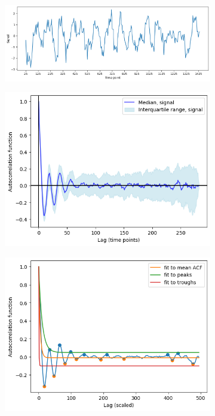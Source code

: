 \begin{figure}
  \centering
  \begin{subfigure}[t]{0.8\textwidth}
  \centering
    \includegraphics[width=\linewidth]{acf_sinusoid_biol_ts.png}
    \caption{
    }
    \label{fig:acf-sinusoid-biol-ts}
  \end{subfigure}

  \begin{subfigure}[t]{0.5\textwidth}
  \centering
    \includegraphics[width=\linewidth]{acf_sinusoid_biol_acf.png}
    \caption{
    }
    \label{fig:acf-sinusoid-biol-acf}
  \end{subfigure}%
  \begin{subfigure}[t]{0.5\textwidth}
  \centering
    \includegraphics[width=\linewidth]{acf_sinusoid_biol_acf_fit.png}
    \caption{
    }
    \label{fig:acf-sinusoid-biol-acf-fit}
  \end{subfigure}


\end{figure}
